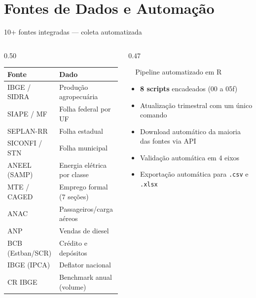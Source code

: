 \documentclass[aspectratio=169, 11pt]{beamer}
\begin{document}
\section{Fontes de Dados e Automação}

\begin{frame}{10+ fontes integradas — coleta automatizada}

  \begin{columns}[T]
    \begin{column}{0.50\textwidth}
      \small
      \renewcommand{\arraystretch}{1.2}
      \begin{tabular}{>{\raggedright}p{2.8cm} >{\raggedright}p{2.8cm}}
        \toprule
        \textbf{Fonte} & \textbf{Dado} \\
        \midrule
        IBGE / SIDRA & Produção agropecuária \\
        \rowcolor{seplanblue!10}
        SIAPE / MF & Folha federal por UF \\
        SEPLAN-RR & Folha estadual \\
        \rowcolor{seplanblue!10}
        SICONFI / STN & Folha municipal \\
        ANEEL (SAMP) & Energia elétrica por classe \\
        \rowcolor{seplanblue!10}
        MTE / CAGED & Emprego formal (7 seções) \\
        ANAC & Passageiros/carga aéreos \\
        \rowcolor{seplanblue!10}
        ANP & Vendas de diesel \\
        BCB (Estban/SCR) & Crédito e depósitos \\
        \rowcolor{seplanblue!10}
        IBGE (IPCA) & Deflator nacional \\
        CR IBGE & Benchmark anual (volume) \\
        \bottomrule
      \end{tabular}
    \end{column}

    \begin{column}{0.47\textwidth}
      \begin{block}{\faRobot\ \ Pipeline automatizado em R}
        \begin{itemize}
          \item \textbf{8 scripts} encadeados (00 a 05f)
          \item Atualização trimestral com um único comando
          \item Download automático da maioria das fontes via API
          \item Validação automática em 4 eixos
          \item Exportação automática para \texttt{.csv} e \texttt{.xlsx}
        \end{itemize}
      \end{block}


\end{column}
\end{columns}
\end{frame}
\end{document}
